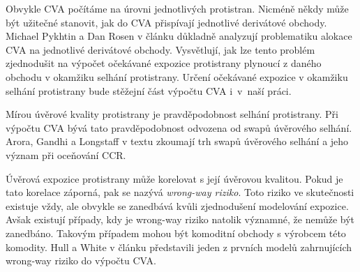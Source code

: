 \documentclass[a4paper,12pt]{report}
\theoremstyle{definition} \newtheorem{definice}[veta]{Definice}
\theoremstyle{remark}
\begin{document}
Obvykle CVA počítáme na úrovni jednotlivých protistran. 
Nicméně někdy může být užitečné stanovit, jak do CVA přispívají jednotlivé derivátové obchody. 
Michael Pykhtin a Dan Rosen v článku \cite{pykhtin2010} důkladně analyzují problematiku alokace CVA na jednotlivé derivátové obchody. 
Vysvětlují, jak lze tento problém zjednodušit na výpočet očekávané expozice protistrany plynoucí z daného obchodu v okamžiku selhání protistrany.
Určení očekávané expozice v okamžiku selhání protistrany bude stěžejní část výpočtu CVA i~v~naší práci.

Mírou úvěrové kvality protistrany je pravděpodobnost selhání protistrany. 
Při výpočtu CVA bývá tato pravděpodobnost odvozena od swapů úvěrového selhání. 
Arora, Gandhi a Longstaff v textu \cite{arora2012} zkoumají trh swapů úvěrového selhání a jeho význam při oceňování CCR.

Úvěrová expozice protistrany může korelovat s její úvěrovou kvalitou. 
Pokud je tato korelace záporná, pak se nazývá \textit{wrong-way riziko}. 
Toto riziko ve skutečnosti existuje vždy, ale obvykle se zanedbává kvůli zjednodušení modelování expozice. 
Avšak existují případy, kdy je wrong-way riziko natolik významné, že nemůže být zanedbáno. 
Takovým případem mohou být komoditní obchody s výrobcem této komodity. 
Hull a White v článku \cite{hull2012cva} představili jeden z prvních modelů zahrnujících wrong-way riziko do výpočtu CVA.
\end{document}
